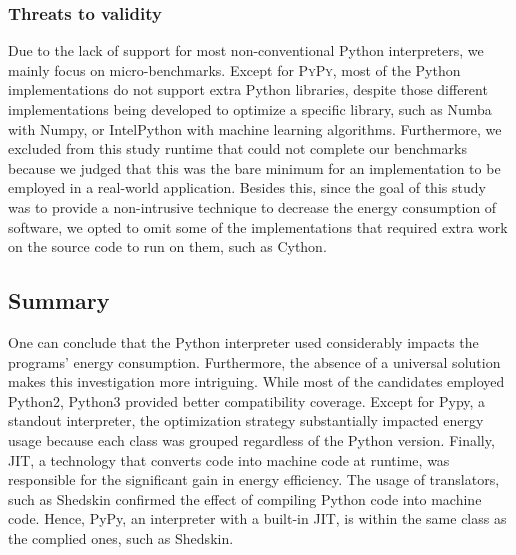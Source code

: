 \subsubsection{Threats to validity}
Due to the lack of support for most non-conventional Python interpreters, we mainly focus on micro-benchmarks.
Except for \textsc{PyPy}, most of the Python implementations do not support extra Python libraries, despite those different implementations being developed to optimize a specific library, such as \textsf{Numba} with \textsf{Numpy}, or \textsf{IntelPython} with machine learning algorithms.
Furthermore, we excluded from this study runtime that could not complete our benchmarks because we judged that this was the bare minimum for an implementation to be employed in a real-world application.
Besides this, since the goal of this study was to provide a non-intrusive technique to decrease the energy consumption of software, we opted to omit some of the implementations that required extra work on the source code to run on them, such as \textsf{Cython}.

\subsection{Summary}
One can conclude that the Python interpreter used considerably impacts the programs' energy consumption.
Furthermore, the absence of a universal solution makes this investigation more intriguing.
While most of the candidates employed \textsf{Python2}, \textsf{Python3} provided better compatibility coverage.
Except for \textsf{Pypy}, a standout interpreter, the optimization strategy substantially impacted energy usage because each class was grouped regardless of the Python version.
Finally, JIT, a technology that converts code into machine code at runtime, was responsible for the significant gain in energy efficiency.
The usage of translators, such as \textsf{Shedskin} confirmed the effect of compiling Python code into machine code. Hence, \textsf{PyPy}, an interpreter with a built-in JIT, is within the same class as the complied ones, such as \textsf{Shedskin}.

